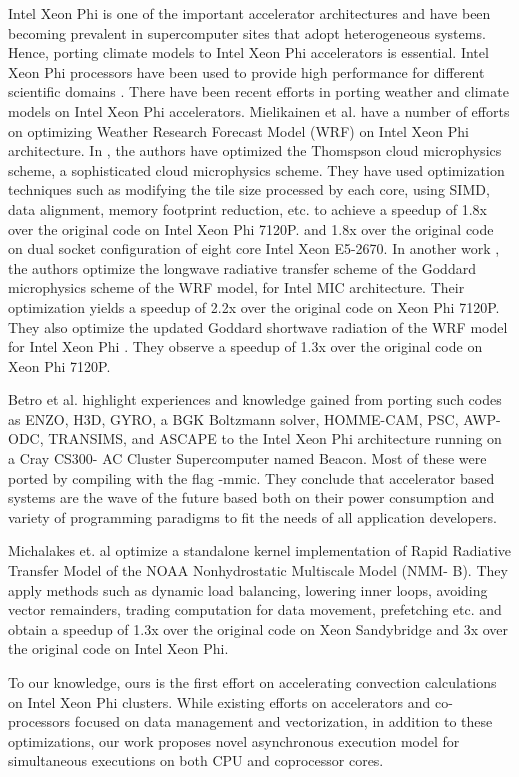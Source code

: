 Intel Xeon Phi is one of the important accelerator architectures and have been becoming prevalent in supercomputer sites that adopt heterogeneous systems. Hence, porting climate models to Intel Xeon Phi accelerators is essential.
Intel Xeon Phi processors have been used to provide high performance for different scientific domains \cite{liu-swaphils-cluster2014,heybrock-latticeqcd-sc2014,luo-mica-bmc2015}.
There have been recent efforts in porting weather and climate models on Intel Xeon Phi accelerators. Mielikainen et al. have a number of efforts on optimizing Weather Research Forecast Model (WRF) on Intel Xeon Phi architecture. In \cite{mielikainen-optwrf-spie2014, mielikainen-revisitingCloud-spie2015}, the authors have  optimized  the  Thomspson  cloud  microphysics scheme,  a sophisticated cloud microphysics scheme.  They have used optimization techniques such as modifying the tile size processed by each core, using SIMD, data alignment, memory footprint reduction, etc.  to achieve a speedup of 1.8x over the original code on Intel Xeon Phi 7120P.
 and 1.8x over the original code on dual socket configuration of eight core Intel Xeon E5-2670. In  another work \cite{mielikainen-longwave-spie2015}, the authors optimize the longwave radiative transfer scheme of the Goddard microphysics scheme of the WRF model, for Intel MIC architecture.  Their optimization yields a speedup of 2.2x over the original code on Xeon Phi 7120P. They also optimize the updated Goddard shortwave radiation of the WRF model for Intel Xeon Phi \cite{mielikainen-shortwave-spie2015}.  They observe a speedup of 1.3x over the original code on Xeon Phi 7120P. 

Betro et al. \cite{betro-performancemetrics-cug2013} highlight experiences and knowledge gained from porting such codes as ENZO,  H3D, GYRO, a  BGK Boltzmann solver,  HOMME-CAM, PSC, AWP-ODC, TRANSIMS, and ASCAPE to the Intel Xeon Phi architecture running on a Cray CS300- AC Cluster Supercomputer named Beacon.
Most of these were ported by compiling with the flag -mmic.  They conclude that accelerator based systems are the wave of the future based both on their power consumption and variety of programming paradigms to  fit the needs of all application developers. 

Michalakes et. al \cite{michalakes-optimizingweathermodel-hmcw2014} optimize a standalone kernel implementation of Rapid Radiative Transfer Model of the NOAA Nonhydrostatic Multiscale Model (NMM- B). They apply methods such as dynamic load balancing, lowering inner loops, avoiding vector remainders, trading computation for data movement, prefetching etc.  and obtain a speedup of 1.3x over the original code on Xeon Sandybridge and 3x over the original code on Intel Xeon Phi.

To our knowledge, ours is the first effort on accelerating convection calculations on Intel Xeon Phi clusters. While existing efforts on accelerators and co-processors focused on data management and vectorization, in addition to these optimizations, our work proposes novel asynchronous execution model for simultaneous executions on both CPU and coprocessor cores.
